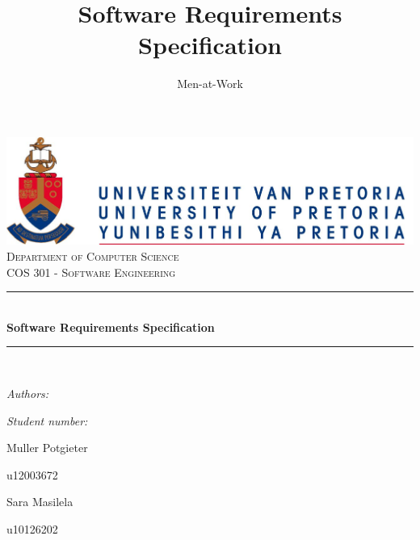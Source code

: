 \documentclass[hidelinks,a4paper,12pt]{article}
\author{Men-at-Work}
\title{ Software Requirements Specification}
\newcommand{\HRule}{\rule{\linewidth}{0.5mm}}
\begin{document}
	\setlength{\parskip}{6pt}
	
	\begin{titlepage}
		
		\begin{center}
			\includegraphics[width=1\textwidth]{./UPLogo2012.jpg}\\[0.4cm]    
			\textsc{\LARGE Department of Computer Science}\\[1.5cm]
			\textsc{\Large COS 301 - Software Engineering}\\[0.5cm]
			\HRule \\[0.4cm]
			{ \huge \bfseries Software Requirements Specification}\\[0.4cm]
			\HRule \\[0.4cm]
			\begin{minipage}{0.4\textwidth}
				\begin{flushleft} \large
					\emph{Authors:}
				\end{flushleft}
			\end{minipage}
			\begin{minipage}{0.4\textwidth}
				\begin{flushright} \large
					\emph{Student number:}
				\end{flushright}
			\end{minipage}
			
			\begin{minipage}{0.4\textwidth}
				\begin{flushleft} \large
					Muller {Potgieter}
				\end{flushleft}
			\end{minipage}
			\begin{minipage}{0.4\textwidth}
				\begin{flushright} \large
					\emph{}
					u12003672
				\end{flushright}
			\end{minipage}
			
			\begin{minipage}{0.4\textwidth}
				\begin{flushleft} \large
					Sara {Masilela}
				\end{flushleft}
			\end{minipage}
			\begin{minipage}{0.4\textwidth}
				\begin{flushright} \large
					\emph{}
					u10126202
				\end{flushright}
			\end{minipage}
			

\end{center}
\end{titlepage}
\end{document}
